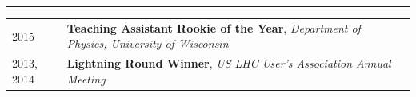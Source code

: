 \documentclass{letter}
\begin{document}
\vspace{-10pt}



\begin{flushleft}
  \Large{\textsc{\textbf{\color{Maroon}{Awards}}}}
  \vspace{1pt} %
  \hrule
\end{flushleft}

\begin{tabular}{p{}p{}}
  2015
  &
  \textbf{Teaching Assistant Rookie of the Year}, \textit{Department of Physics, University of Wisconsin} 
  \\
  2013, 2014
  & 
  \textbf{Lightning Round Winner}, \textit{US LHC User's Association Annual Meeting}
\\
\end{tabular}
\end{document}
